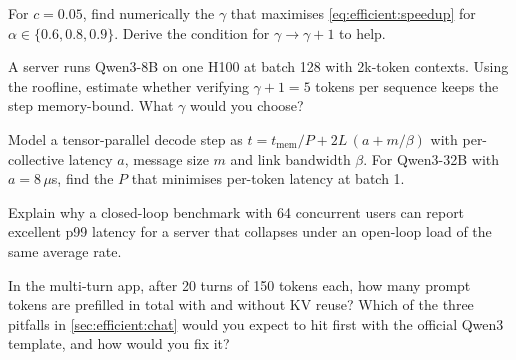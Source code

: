 \begin{exercise}
For $c=0.05$, find numerically the $\gamma$ that maximises \cref{eq:efficient:speedup}
for $\alpha\in\{0.6,0.8,0.9\}$. Derive the condition for $\gamma\to\gamma+1$ to help.
\end{exercise}
\begin{exercise}
A server runs Qwen3-8B on one H100 at batch 128 with 2k-token contexts. Using the
roofline, estimate whether verifying $\gamma+1=5$ tokens per sequence keeps the step
memory-bound. What $\gamma$ would you choose?
\end{exercise}
\begin{exercise}[TP latency]
Model a tensor-parallel decode step as $t = t_{\text{mem}}/P + 2L\,(a + m/\beta)$ with
per-collective latency $a$, message size $m$ and link bandwidth $\beta$. For Qwen3-32B
with $a=8\,\mu$s, find the $P$ that minimises per-token latency at batch 1.
\end{exercise}
\begin{exercise}
Explain why a closed-loop benchmark with 64 concurrent users can report excellent p99
latency for a server that collapses under an open-loop load of the same average rate.
\end{exercise}
\begin{exercise}
In the multi-turn app, after 20 turns of 150 tokens each, how many prompt tokens are
prefilled in total with and without KV reuse? Which of the three pitfalls in
\cref{sec:efficient:chat} would you expect to hit first with the official Qwen3
template, and how would you fix it?
\end{exercise}

